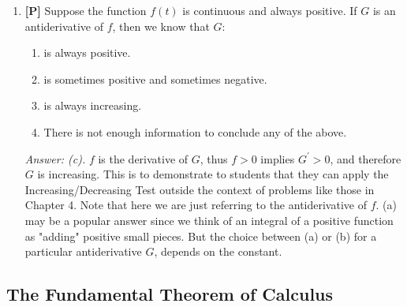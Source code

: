 \documentclass[12pt]{article}
\begin{document}
\begin{enumerate}
{\it Answer: False.} As students often get confused in the
mechanics of the process of going back and forth between
functions, their derivatives and antiderivatives, a discussion
using the above problem can help them clarify their
misunderstandings. 

\bigskip

\item {\bf [P]} Suppose the function $f(t)$ is continuous and always
positive. If $G$ is an antiderivative of $f$, then we know that
$G$:
\begin{enumerate}
\item is always positive.
\item is sometimes positive and sometimes negative.
\item is always increasing.
\item There is not enough information to conclude any of the
above.
\end{enumerate}

{\it Answer: (c).} $f$ is the derivative of $G$, thus $f>0$ implies $G^{\prime}>0$, 
and therefore $G$ is increasing. This is to demonstrate to students that they
can apply the Increasing/Decreasing Test outside the context of
problems like those in Chapter 4. Note that here we are just
referring to the antiderivative of $f$. (a) may be a popular answer 
since we think of an integral of a positive function as "adding" positive small pieces. 
But the choice between (a) or (b) for a particular antiderivative $G$, depends on the constant.

\end{enumerate}

\subsection{The Fundamental Theorem of Calculus}
\end{document}
